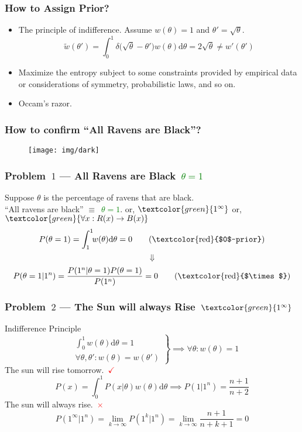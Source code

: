 \documentclass[UTF8,11pt,colorlinks,compress,openany]{beamer}%
\begin{document}
\begin{frame}\frametitle{How to Assign Prior?}
	\begin{itemize}
		\item The principle of indifference.
		Assume $w(\theta)=1$ and $\theta'=\sqrt{\theta}$.
		\[\tilde{w}(\theta')=\int_{0}^{1}\!\!\delta\big(\sqrt{\theta}-\theta'\big)w(\theta)\mathrm{d}\theta=2\sqrt{\theta}\neq w'(\theta')\]
		\item Maximize the entropy subject to some constraints provided by empirical data or considerations of symmetry, probabilistic laws, and so on.
		\item Occam's razor.
	\end{itemize}
\end{frame}

\begin{frame}\frametitle{How to confirm ``All Ravens are Black''?}
	\begin{figure}
		\texttt{[image: img/dark]}
	\end{figure}
\end{frame}

\begin{frame}\frametitle{Problem~$1$ --- All Ravens are Black~\textcolor{green}{$\theta=1$}}
	\noindent Suppose $\theta$ is the percentage of ravens that are black.\\
	\noindent ``All ravens are black'' $\equiv$~\textcolor{green}{$\theta=1$}.
	or, $\textcolor{green}{1^\infty}$ or, $\textcolor{green}{\forall x: R(x)\to B(x)}$
	\[P(\theta=1)=\int_1^1\!\!w(\theta)\mathrm{d}\theta=0 \tag{\textcolor{red}{$0$~prior}}\]
	\[\Downarrow\]
	\[P(\theta=1|1^n)=\dfrac{P(1^n|\theta=1)P(\theta=1)}{P(1^n)}=0 \tag{\textcolor{red}{$\times$}}\]
\end{frame}

\begin{frame}\frametitle{Problem~$2$ --- The Sun will always Rise~$\textcolor{green}{1^\infty}$}
	\noindent Indifference Principle
	\[\left.
	\begin{aligned}
	&\int_0^1\!\! w(\theta)\mathrm{d}\theta=1\\
	&\forall\theta,\theta': w(\theta)=w(\theta')
	\end{aligned}
	\right\rbrace\implies\forall\theta: w(\theta)=1
	\]
	The sun will rise tomorrow.~\textcolor{red}{$\checkmark$}
	\[
	P(x)=\int_0^1\!\! P(x|\theta)w(\theta)\mathrm{d}\theta \implies P(1|1^n)=\dfrac{n+1}{n+2}
	\]
	The sun will always rise.~\textcolor{red}{$\times$}
	\[P(1^{\infty}|1^n)=\lim\limits_{k\to\infty}P(1^k|1^n)=\lim\limits_{k\to\infty}\dfrac{n+1}{n+k+1}=0\]
\end{frame}
\end{document}
